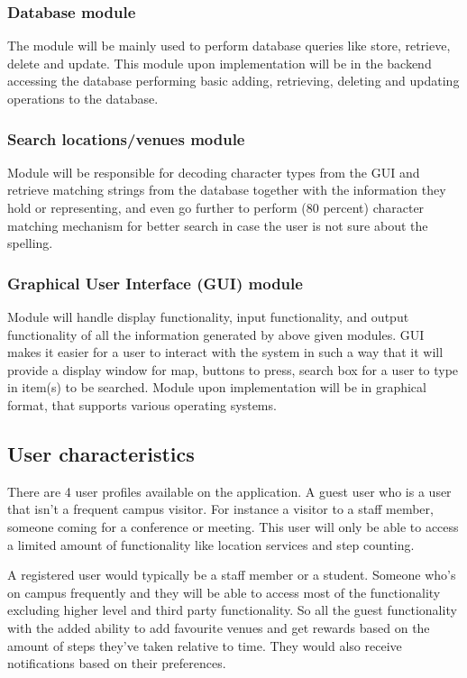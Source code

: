 \documentclass[11pt]{article}
\begin{document}
			\subsubsection{Database module}
			The module will be mainly used to perform database queries like store, retrieve, delete and update. This module upon implementation will be in the backend accessing the database performing basic adding, retrieving, deleting and updating operations to the database.
			\subsubsection{Search locations/venues module}
			Module will be responsible for decoding character types from the GUI and retrieve matching strings from the database together with the information they hold or representing, and even go further to perform (80 percent) character matching mechanism for better search in case the user is not sure about the spelling.
			\subsubsection{Graphical User Interface (GUI) module}
			Module will handle display functionality, input functionality, and output functionality of all the information generated by above given modules. GUI makes it easier for a user to interact with the system in such a way that it will provide a display window for map, buttons to press, search box for a user to type in item(s) to be searched. Module upon implementation will be in graphical format, that supports various operating systems.
			
      \subsection{User characteristics}
      There are 4 user profiles available on the application. A guest user who is a user that isn’t a frequent campus visitor. 		 For instance a visitor to a staff member, someone coming for a conference or meeting. This user will only be able to 			access a limited amount of functionality like location services and step counting.  

      A registered user would typically be a staff member or a student. Someone who’s on campus frequently and they will be 			able to access most of the functionality excluding higher level and third party functionality. So all the guest 			functionality with the added ability to add favourite venues and get rewards based on the amount of steps they’ve taken 		relative to time. They would also receive notifications based on their preferences.
\end{document}

